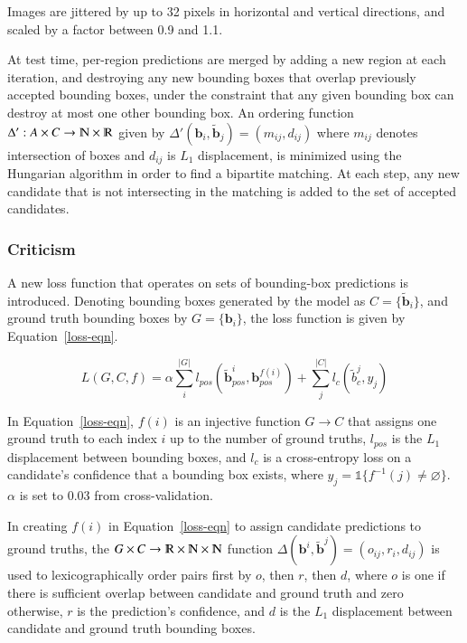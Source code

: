 \documentclass[a4paper, 12pt]{article}
\begin{document}
Images are jittered by up to 32 pixels in horizontal and vertical directions,
and scaled by a factor between 0.9 and 1.1.

At test time, per-region predictions are merged by adding a new region at each
iteration, and destroying any new bounding boxes that overlap previously
accepted bounding boxes, under the constraint that any given bounding box can
destroy at most one other bounding box. An ordering function
$\Delta': A \times C \rightarrow \varmathbb{N} \times \varmathbb{R}$ given by
$\Delta'(\boldsymbol{b}_i, \tilde{\boldsymbol{b}}_j) = (m_{ij}, d_{ij})$ where
$m_{ij}$ denotes intersection of boxes and $d_{ij}$ is $L_1$ displacement, is
minimized using the Hungarian algorithm in order to find a bipartite matching.
At each step, any new candidate that is not intersecting in the matching is
added to the set of accepted candidates.

\subsubsection{Criticism}

A new loss function that operates on sets of bounding-box predictions is
introduced. Denoting bounding boxes generated by the model as
$C = \{\tilde{\boldsymbol{b}}_i\}$, and ground truth bounding boxes by
$G = \{\boldsymbol{b}_i\}$, the loss function is given by
Equation~\ref{loss-eqn}.

\begin{equation}
        L(G, C, f) = \alpha\sum_i^{|G|}
                             l_{pos}\left(\tilde{\boldsymbol{b}}_{pos}^i, \boldsymbol{b}_{pos}^{f(i)}\right) +
                     \sum_j^{|C|} l_c\left(\tilde{b}_c^j, y_j\right)
        \label{loss-eqn}
\end{equation}

In Equation~\ref{loss-eqn}, $f(i)$ is an injective function $G \rightarrow C$
that assigns one ground truth to each index $i$ up to the number of ground
truths, $l_{pos}$ is the $L_1$ displacement between bounding boxes, and $l_c$
is a cross-entropy loss on a candidate's confidence that a bounding box exists,
where $y_j = \mathbb{1}\{f^{-1}(j) \neq \varnothing\}$. $\alpha$ is set to 0.03
from cross-validation.

In creating $f(i)$ in Equation~\ref{loss-eqn} to assign candidate predictions
to ground truths, the
$G \times C \rightarrow \varmathbb{R} \times \varmathbb{N} \times \varmathbb{N}$
function
$\Delta\left(\boldsymbol{b}^i, \tilde{\boldsymbol{b}}^j\right) = (o_{ij}, r_i, d_{ij})$
is used to lexicographically order pairs first by $o$, then $r$, then $d$,
where $o$ is one if there is sufficient overlap between candidate and ground
truth and zero otherwise, $r$ is the prediction's confidence, and $d$ is the
$L_1$ displacement between candidate and ground truth bounding boxes.
\end{document}
